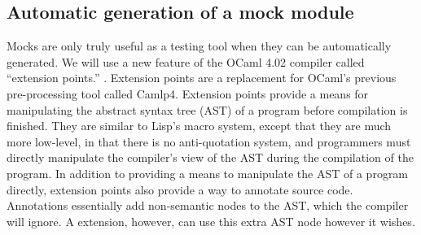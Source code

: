 

\subsection{Automatic generation of a mock module}
\label{application:generation}

Mocks are only truly useful as a testing tool when they can be
automatically generated. We will use a new feature of the OCaml 4.02
compiler called ``extension points.'' \cite{ocaml:spec}. Extension
points are a replacement for OCaml's previous pre-processing tool
called Camlp4. Extension points provide a means for manipulating the
abstract syntax tree (AST) of a program before compilation is
finished. They are similar to Lisp's macro system, except that they
are much more low-level, in that there is no anti-quotation system, and
programmers must directly manipulate the compiler's view of the AST
during the compilation of the program. In addition to providing a
means to manipulate the AST of a program directly, extension points
also provide a way to annotate source code. Annotations essentially
add non-semantic nodes to the AST, which the compiler will ignore. A
extension, however, can use this extra AST node however it wishes.

